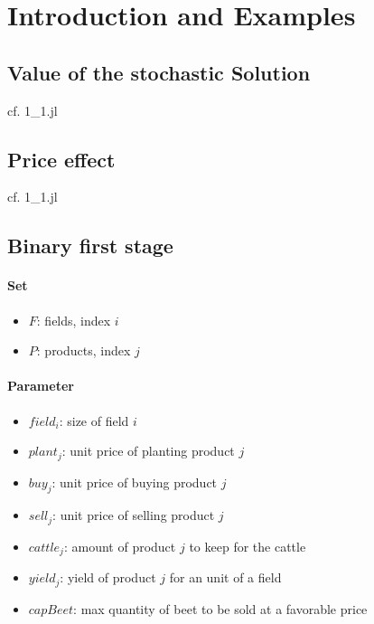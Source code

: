 \documentclass[12pt]{article}
\begin{document}
\section{Introduction and Examples}

\subsection{Value of the stochastic Solution}
cf. 1\_1.jl

\subsection{Price effect}
cf. 1\_1.jl

\subsection{Binary first stage}
\paragraph{Set}
\begin{itemize}
	\item $F$: fields, index $i$
	\item $P$: products, index $j$
\end{itemize}
\paragraph{Parameter}
\begin{itemize}
	\item $field_i$: size of field $i$
	\item $plant_j$: unit price of planting product $j$
	\item $buy_j$: unit price of buying product $j$
	\item $sell_j$: unit price of selling product $j$
	\item $cattle_j$: amount of product $j$ to keep for the cattle
	\item $yield_j$: yield of product $j$ for an unit of a field
	\item $capBeet$: max quantity of beet to be sold at a favorable price
\end{itemize}
\end{document}
